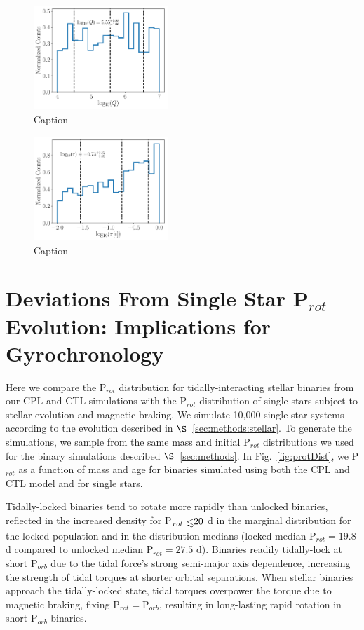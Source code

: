 \documentclass[twocolumn]{aastex61}
\def\lsim{~\rlap{$<$}{\lower 1.0ex\hbox{$\sim$}}}
\begin{document}
\begin{figure}
	\includegraphics[width=0.45\textwidth]{../Plots/qLurie.pdf}
   \caption{Caption}%
    \label{fig:qLurie}%
\end{figure}

\begin{figure}
	\includegraphics[width=0.45\textwidth]{../Plots/tauLurie.pdf}
   \caption{Caption}%
    \label{fig:tauLurie}%
\end{figure}

\section{Deviations From Single Star P$_{rot}$ Evolution: Implications for Gyrochronology} \label{sec:gyro}

Here we compare the P$_{rot}$ distribution for tidally-interacting stellar binaries from our CPL and CTL simulations with the P$_{rot}$ distribution of single stars subject to stellar evolution and magnetic braking.  We simulate 10,000 single star systems according to the evolution described in $\S$~\ref{sec:methods:stellar}.  To generate the simulations, we sample from the same mass and initial P$_{rot}$ distributions we used for the binary simulations described $\S$~\ref{sec:methods}. In Fig.~\ref{fig:protDist}, we P$_{rot}$ as a function of mass and age for binaries simulated using both the CPL and CTL model and for single stars. 

Tidally-locked binaries tend to rotate more rapidly than unlocked binaries, reflected in the increased density for P$_{rot} \lsim 20$ d in the marginal distribution for the locked population and in the distribution medians (locked median P$_{rot} = 19.8$ d compared to unlocked median P$_{rot} = 27.5$ d). Binaries readily tidally-lock at short P$_{orb}$ due to the tidal force's strong semi-major axis dependence, increasing the strength of tidal torques at shorter orbital separations. When stellar binaries approach the tidally-locked state, tidal torques overpower the torque due to magnetic braking, fixing P$_{rot} = $P$_{orb}$, resulting in long-lasting rapid rotation in short P$_{orb}$ binaries. 
\end{document}
